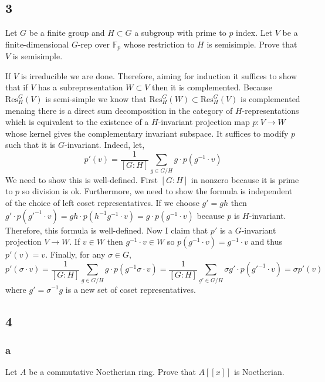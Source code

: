 \documentclass[12pt]{article}
\begin{document}
\subsection{3}

\begin{exercise}
Let $G$ be a finite group and $H \subset G$ a subgroup with prime to $p$ index. Let $V$ be a finite-dimensional $G$-rep over $\mathbb{F}_p$ whose restriction to $H$ is semisimple. Prove that $V$ is semisimple.
\end{exercise}

If $V$ is irreducible we are done. Therefore, aiming for induction it suffices to show that if $V$ has a subrepresentation $W \subset V$ then it is complemented. Because $\mathrm{Res}^G_H(V)$ is semi-simple we know that $\mathrm{Res}^G_H(W) \subset \mathrm{Res}^G_H(V)$ is complemented menaing there is a direct sum decomposition in the category of $H$-representations which is equivalent to the existence of a $H$-invariant projection map $p : V \to W$ whose kernel gives the complementary invariant subspace. It suffices to modify $p$ such that it is $G$-invariant. Indeed, let,
\[ p'(v) = \frac{1}{[G : H]} \sum_{g \in G / H} g \cdot p(g^{-1} \cdot v) \]
We need to show this is well-defined. First $[G : H]$ in nonzero because it is prime to $p$ so division is ok. Furthermore, we need to show the formula is independent of the choice of left coset representatives. If we choose $g' = g h$ then $g' \cdot p(g'^{-1} \cdot v) = g h \cdot p(h^{-1} g^{-1} \cdot v) = g \cdot p(g^{-1} \cdot v)$ because $p$ is $H$-invariant. Therefore, this formula is well-defined. Now I claim that $p'$ is a $G$-invariant projection $V \to W$. If $v \in W$ then $g^{-1} \cdot v \in W$ so $p(g^{-1} \cdot v) = g^{-1} \cdot v$ and thus $p'(v) = v$. Finally, for any $\sigma \in G$,
\[ p'(\sigma \cdot v) = \frac{1}{[G : H]} \sum_{g \in G / H} g \cdot p(g^{-1} \sigma \cdot v) = \frac{1}{[G : H]} \sum_{g' \in G / H} \sigma g' \cdot p(g'^{-1} \cdot v) = \sigma p'(v) \]
where $g' = \sigma^{-1} g$ is a new set of coset representatives.

\subsection{4}

\subsubsection{a}


\begin{exercise}
Let $A$ be a commutative Noetherian ring. Prove that $A[[x]]$ is Noetherian. 
\end{exercise}
\end{document}

